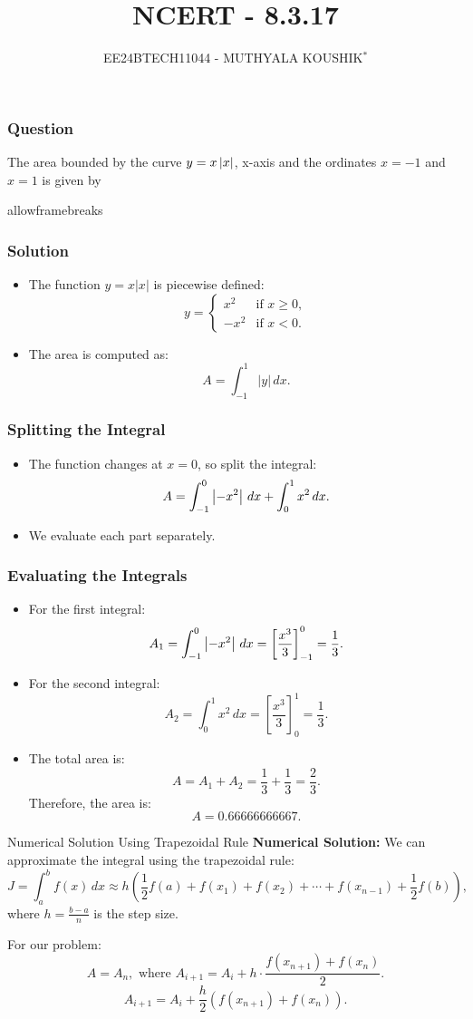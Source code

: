 \documentclass{beamer}
\begin{document}
\title{NCERT - 8.3.17}
\author{EE24BTECH11044 - MUTHYALA KOUSHIK$^{*}$}
\date{}
\frame{\titlepage}

\begin{frame}
\frametitle{Question}
The area bounded by the curve $y=x\left\vert x\right\vert$, x-axis and the ordinates $x=-1$ and $x=1$ is given by 
\end{frame}

\begin{frame}{allowframebreaks}
\frametitle{Solution}
\begin{itemize}
  \item The function \( y = x |x| \) is piecewise defined:
  \[
  y = 
  \begin{cases} 
  x^2 & \text{if } x \geq 0, \\
  -x^2 & \text{if } x < 0.
  \end{cases}
  \]
  \item The area is computed as:
  \[
  A = \int_{-1}^{1} |y| \, dx.
  \]
\end{itemize}
\end{frame}

\begin{frame}
\frametitle{Splitting the Integral}
\begin{itemize}
  \item The function changes at \( x = 0 \), so split the integral:
  \[
  A = \int_{-1}^{0} \left\vert-x^2\right\vert \, dx + \int_{0}^{1} x^2 \, dx.
  \]
  \item We evaluate each part separately.
\end{itemize}
\end{frame}

\begin{frame}
\frametitle{Evaluating the Integrals}
\begin{itemize}
  \item For the first integral:
  \[
  A_1 = \int_{-1}^{0} \left\vert-x^2\right\vert \, dx =  \left[ \frac{x^3}{3} \right]_{-1}^{0} = \frac{1}{3}.
  \]
  \item For the second integral:
  \[
  A_2 = \int_{0}^{1} x^2 \, dx = \left[ \frac{x^3}{3} \right]_{0}^{1} = \frac{1}{3}.
  \]
  \item The total area is:
  \[
  A = A_1 + A_2 = \frac{1}{3} + \frac{1}{3} = \frac{2}{3}.
  \]
 Therefore, the area is:
\[
A = 0.66666666667.
\] 
\end{itemize}
\end{frame}

\begin{frame}{Numerical Solution Using Trapezoidal Rule}
\textbf{Numerical Solution:}
We can approximate the integral using the trapezoidal rule:
\[
J = \int_a^b f(x) \, dx \approx h \left( \frac{1}{2} f(a) + f(x_1) + f(x_2) + \cdots + f(x_{n-1}) + \frac{1}{2} f(b) \right),
\]
where \( h = \frac{b - a}{n} \) is the step size.

For our problem:
\[
A = A_n, \text{ where } A_{i+1} = A_i + h \cdot \frac{f(x_{n+1}) + f(x_n)}{2}.
\]
\[
A_{i+1} = A_i + \frac{h}{2} \left( f(x_{n+1}) + f(x_n) \right).
\]
\end{frame}
\end{document}
